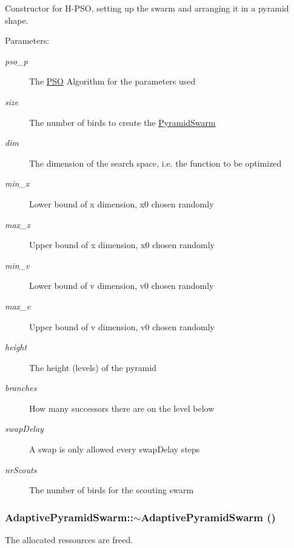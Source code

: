 Constructor for H-PSO, setting up the swarm and arranging it in a pyramid shape. 

\begin{Desc}
\item[Parameters: ]\par
\begin{description}
\item[{\em 
pso\_\-p}]The \hyperlink{classPSO}{PSO} Algorithm for the parameters used \item[{\em 
size}]The number of birds to create the \hyperlink{classPyramidSwarm}{PyramidSwarm} \item[{\em 
dim}]The dimension of the search space, i.e. the function to be optimized \item[{\em 
min\_\-x}]Lower bound of x dimension, x0 chosen randomly \item[{\em 
max\_\-x}]Upper bound of x dimension, x0 chosen randomly \item[{\em 
min\_\-v}]Lower bound of v dimension, v0 chosen randomly \item[{\em 
max\_\-v}]Upper bound of v dimension, v0 chosen randomly \item[{\em 
height}]The height (levels) of the pyramid \item[{\em 
branches}]How many successors there are on the level below \item[{\em 
swapDelay}]A swap is only allowed every swapDelay steps \item[{\em 
nrScouts}]The number of birds for the scouting swarm \end{description}
\end{Desc}
\hypertarget{classAdaptivePyramidSwarm_2369e91955310eb199d661b1a2fb3905}{
\subsubsection{\setlength{\rightskip}{0pt plus 5cm}AdaptivePyramidSwarm::$\sim$AdaptivePyramidSwarm ()}}
\label{classAdaptivePyramidSwarm_2369e91955310eb199d661b1a2fb3905}


The allocated ressources are freed. 




